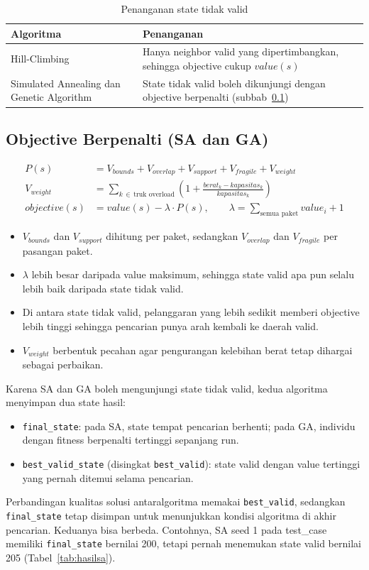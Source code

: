 \documentclass[12pt,a4paper]{report}
\newcommand{\hd}[1]{\cellcolor{hdr}\textbf{#1}}
\newcommand{\code}[1]{\texttt{\small #1}}
\begin{document}
\begin{table}[H]
\centering
\caption{Penanganan state tidak valid}\label{tab:invalid}
\small
\begin{tabular}{|L{4.5cm}|L{8.7cm}|}
\hline
\hd{Algoritma} & \hd{Penanganan} \\ \hline
Hill-Climbing & Hanya neighbor valid yang dipertimbangkan, sehingga objective cukup $value(s)$ \\ \hline
Simulated Annealing dan Genetic Algorithm & State tidak valid boleh dikunjungi dengan objective berpenalti (subbab~\ref{sub:penalti}) \\ \hline
\end{tabular}
\end{table}

\subsection{Objective Berpenalti (SA dan GA)}\label{sub:penalti}
\begin{align*}
P(s) &= V_{bounds} + V_{overlap} + V_{support} + V_{fragile} + V_{weight} \\
V_{weight} &= \sum_{k\,\in\,\text{truk overload}} \left(1 + \frac{berat_k - kapasitas_k}{kapasitas_k}\right) \\
objective(s) &= value(s) - \lambda \cdot P(s), \qquad \lambda = \sum_{\text{semua paket}} value_i + 1
\end{align*}
\begin{itemize}[leftmargin=1.5cm]
  \item $V_{bounds}$ dan $V_{support}$ dihitung per paket, sedangkan $V_{overlap}$ dan $V_{fragile}$ per pasangan paket.
  \item $\lambda$ lebih besar daripada value maksimum, sehingga state valid apa pun selalu lebih baik daripada state tidak valid.
  \item Di antara state tidak valid, pelanggaran yang lebih sedikit memberi objective lebih tinggi sehingga pencarian punya arah kembali ke daerah valid.
  \item $V_{weight}$ berbentuk pecahan agar pengurangan kelebihan berat tetap dihargai sebagai perbaikan.
\end{itemize}
Karena SA dan GA boleh mengunjungi state tidak valid, kedua algoritma menyimpan dua state hasil:
\begin{itemize}[leftmargin=1.5cm]
  \item \code{final\_state}: pada SA, state tempat pencarian berhenti; pada GA, individu dengan
        fitness berpenalti tertinggi sepanjang run.
  \item \code{best\_valid\_state} (disingkat \code{best\_valid}): state valid dengan value tertinggi
        yang pernah ditemui selama pencarian.
\end{itemize}
Perbandingan kualitas solusi antaralgoritma memakai \code{best\_valid}, sedangkan
\code{final\_state} tetap disimpan untuk menunjukkan kondisi algoritma di akhir pencarian.
Keduanya bisa berbeda. Contohnya, SA seed 1 pada test\_case memiliki \code{final\_state} bernilai
200, tetapi pernah menemukan state valid bernilai 205 (Tabel~\ref{tab:hasilsa}).
\end{document}
